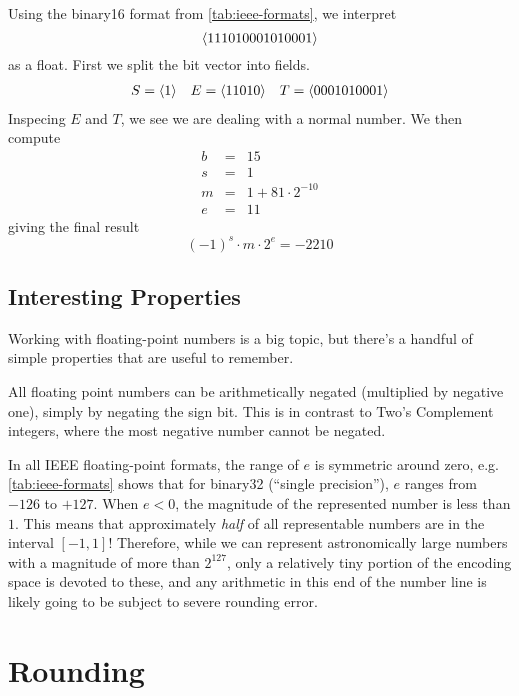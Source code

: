 \begin{example}
  Using the binary16 format from \cref{tab:ieee-formats}, we interpret
  \[
    \langle 111010001010001 \rangle
  \]
  as a float.  First we split the bit vector into fields.
  \[
    \begin{array}{lll}
      S=\langle 1 \rangle & E=\langle 11010 \rangle & T=\langle 0001010001 \rangle
    \end{array}
  \]
  Inspecing $E$ and $T$, we see we are dealing with a normal number.  We then compute
  \[
    \begin{array}{ccr}
      b &=& 15 \\
      s &=& 1 \\
      m &=& 1 + 81 \cdot 2^{-10} \\
      e &=& 11
    \end{array}
  \]
  giving the final result
  \[
    (-1)^{s} \cdot m \cdot 2^{e} = -2210
  \]
\end{example}

\subsection{Interesting Properties}

Working with floating-point numbers is a big topic, but there's a
handful of simple properties that are useful to remember.

All floating point numbers can be arithmetically negated (multiplied
by negative one), simply by negating the sign bit.  This is in
contrast to Two's Complement integers, where the most negative number
cannot be negated.

In all IEEE floating-point formats, the range of $e$ is symmetric
around zero, e.g. \cref{tab:ieee-formats} shows that for binary32
(``single precision''), $e$ ranges from $-126$ to $+127$.  When $e<0$,
the magnitude of the represented number is less than $1$.  This means
that approximately \emph{half} of all representable numbers are in the
interval $[-1,1]$!  Therefore, while we can represent astronomically
large numbers with a magnitude of more than $2^{127}$, only a
relatively tiny portion of the encoding space is devoted to these, and
any arithmetic in this end of the number line is likely going to be
subject to severe rounding error.

\section{Rounding}
\label{sec:rounding}

